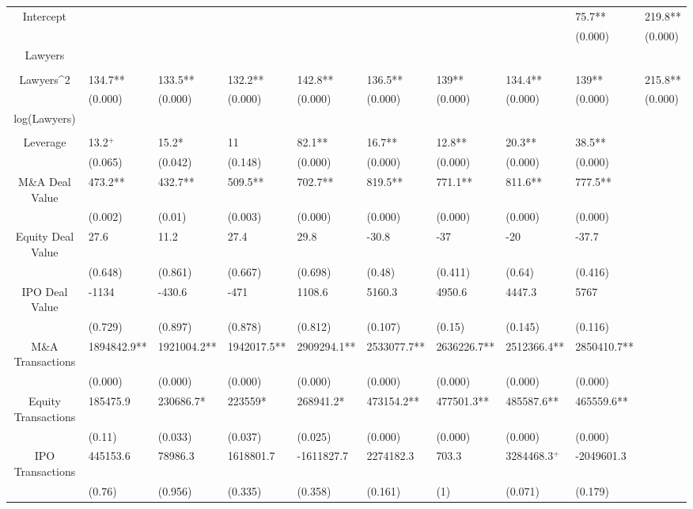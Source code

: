 \documentclass{article}
\begin{document}
\begin{table}[H]
\begin{tabular}{|clllllllll|}
Intercept &  &  &  &  &  &  &  & 75.7** & 219.8** \\ 
   &  &  &  &  &  &  &  & (0.000) & (0.000) \\ 
  Lawyers &  &  &  &  &  &  &  &  &  \\ 
   &  &  &  &  &  &  &  &  &  \\ 
  Lawyers^2 & 134.7** & 133.5** & 132.2** & 142.8** & 136.5** & 139** & 134.4** & 139** & 215.8** \\ 
   & (0.000) & (0.000) & (0.000) & (0.000) & (0.000) & (0.000) & (0.000) & (0.000) & (0.000) \\ 
  log(Lawyers) &  &  &  &  &  &  &  &  &  \\ 
   &  &  &  &  &  &  &  &  &  \\ 
  Leverage & 13.2$^{+}$ & 15.2* & 11 & 82.1** & 16.7** & 12.8** & 20.3** & 38.5** &  \\ 
   & (0.065) & (0.042) & (0.148) & (0.000) & (0.000) & (0.000) & (0.000) & (0.000) &  \\ 
  M\&A Deal Value & 473.2** & 432.7** & 509.5** & 702.7** & 819.5** & 771.1** & 811.6** & 777.5** &  \\ 
   & (0.002) & (0.01) & (0.003) & (0.000) & (0.000) & (0.000) & (0.000) & (0.000) &  \\ 
  Equity Deal Value & 27.6 & 11.2 & 27.4 & 29.8 & -30.8 & -37 & -20 & -37.7 &  \\ 
   & (0.648) & (0.861) & (0.667) & (0.698) & (0.48) & (0.411) & (0.64) & (0.416) &  \\ 
  IPO Deal Value & -1134 & -430.6 & -471 & 1108.6 & 5160.3 & 4950.6 & 4447.3 & 5767 &  \\ 
   & (0.729) & (0.897) & (0.878) & (0.812) & (0.107) & (0.15) & (0.145) & (0.116) &  \\ 
  M\&A Transactions & 1894842.9** & 1921004.2** & 1942017.5** & 2909294.1** & 2533077.7** & 2636226.7** & 2512366.4** & 2850410.7** &  \\ 
   & (0.000) & (0.000) & (0.000) & (0.000) & (0.000) & (0.000) & (0.000) & (0.000) &  \\ 
  Equity Transactions & 185475.9 & 230686.7* & 223559* & 268941.2* & 473154.2** & 477501.3** & 485587.6** & 465559.6** &  \\ 
   & (0.11) & (0.033) & (0.037) & (0.025) & (0.000) & (0.000) & (0.000) & (0.000) &  \\ 
  IPO Transactions & 445153.6 & 78986.3 & 1618801.7 & -1611827.7 & 2274182.3 & 703.3 & 3284468.3$^{+}$ & -2049601.3 &  \\ 
   & (0.76) & (0.956) & (0.335) & (0.358) & (0.161) & (1) & (0.071) & (0.179) &  \\ 

\end{tabular}
\end{table}
\end{document}
